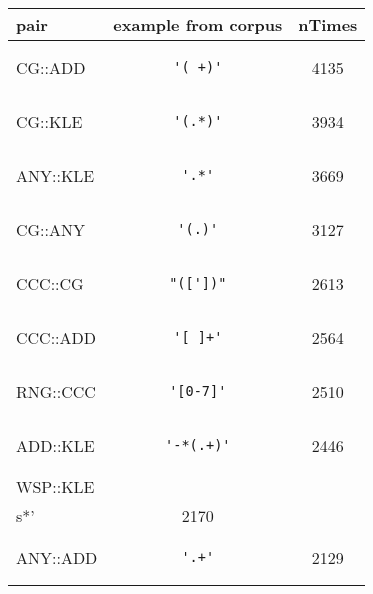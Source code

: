 \begin{center}
\begin{tabular}{lcc}
\toprule
pair & example from corpus & nTimes \\ 
\midrule
CG::ADD & \begin{minipage}{2in}
\begin{verbatim}
'( +)'\end{verbatim}
\end{minipage}
& 4135 \\ 
\midrule
CG::KLE & \begin{minipage}{2in}
\begin{verbatim}
'(.*)'\end{verbatim}
\end{minipage}
& 3934 \\ 
\midrule
ANY::KLE & \begin{minipage}{2in}
\begin{verbatim}
'.*'\end{verbatim}
\end{minipage}
& 3669 \\ 
\midrule
CG::ANY & \begin{minipage}{2in}
\begin{verbatim}
'(.)'\end{verbatim}
\end{minipage}
& 3127 \\ 
\midrule
CCC::CG & \begin{minipage}{2in}
\begin{verbatim}
"(['])"\end{verbatim}
\end{minipage}
& 2613 \\ 
\midrule
CCC::ADD & \begin{minipage}{2in}
\begin{verbatim}
'[ ]+'\end{verbatim}
\end{minipage}
& 2564 \\ 
\midrule
RNG::CCC & \begin{minipage}{2in}
\begin{verbatim}
'[0-7]'\end{verbatim}
\end{minipage}
& 2510 \\ 
\midrule
ADD::KLE & \begin{minipage}{2in}
\begin{verbatim}
'-*(.+)'\end{verbatim}
\end{minipage}
& 2446 \\ 
\midrule
WSP::KLE & \begin{minipage}{2in}
\begin{verbatim}
'\\s*'\end{verbatim}
\end{minipage}
& 2170 \\ 
\midrule
ANY::ADD & \begin{minipage}{2in}
\begin{verbatim}
'.+'\end{verbatim}
\end{minipage}
& 2129 \\ 
\bottomrule
\end{tabular}
\end{center}
